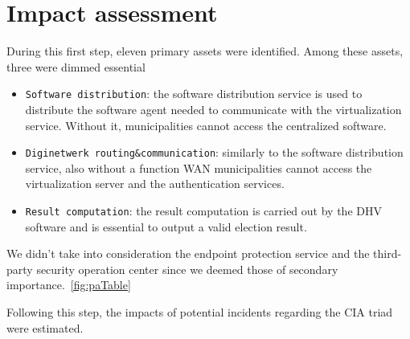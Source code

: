 \section*{Impact assessment}

During this first step, eleven primary assets were identified. Among these assets, three were dimmed essential

\begin{itemize}
    \item \texttt{Software distribution}: the software distribution service is used to distribute the software agent needed to communicate with the virtualization service. Without it, municipalities cannot access the centralized software.
    \item \texttt{Diginetwerk routing\&communication}: similarly to the software distribution service, also without a function WAN municipalities cannot access the virtualization server and the authentication services.
    \item \texttt{Result computation}: the result computation is carried out by the DHV software and is essential to output a valid election result.
\end{itemize}

We didn't take into consideration the endpoint protection service and the third-party security operation center since we deemed those of secondary importance.~\ref{fig:paTable}

Following this step, the impacts of potential incidents regarding the CIA triad were estimated.
